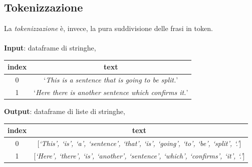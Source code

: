 \documentclass[12pt]{report}
\theoremstyle{definition}
\begin{document}
\subsection{Tokenizzazione}
La \textit{tokenizzazione} è, invece, la pura suddivisione delle frasi in token.
\\
\\
\textbf{Input}: dataframe di stringhe,
\begin{center}
    \begin{tabular}{|c|c|}
    \hline
    \textbf{index} & \textbf{text} \\
    \hline
         0 & `\textit{This is a sentence that is going to be split.}'\\
         1 & `\textit{Here there is another sentence which confirms it.}'\\
    \hline
    \end{tabular}
\end{center}
\textbf{Output}: dataframe di liste di stringhe,
\begin{center}
    \begin{tabular}{|c|c|}
    \hline
    \textbf{index} & \textbf{text} \\
    \hline
         0 & [\textit{`This', `is', `a', `sentence', `that', `is', `going', `to', `be', `split', `.'}]\\
         1 & [\textit{`Here', `there', `is', `another', `sentence', `which', `confirms', `it', `.'}]\\
    \hline
    \end{tabular}
\end{center}
\end{document}
